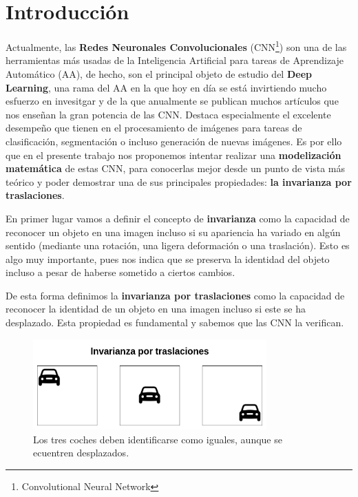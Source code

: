 

\chapter{Introducción}

\noindent Actualmente, las \textbf{Redes Neuronales Convolucionales} (CNN\footnote{Convolutional Neural Network}) son una de las herramientas más usadas de la Inteligencia Artificial para tareas de Aprendizaje Automático (AA), de hecho, son el principal objeto de estudio del \textbf{Deep Learning}, una rama del AA en la que hoy en día se está invirtiendo mucho esfuerzo en invesitgar y de la que anualmente se publican muchos artículos que nos enseñan la gran potencia de las CNN. Destaca especialmente el excelente desempeño que tienen en el procesamiento de imágenes para tareas de clasificación, segmentación o incluso generación de nuevas imágenes. Es por ello que en el presente trabajo nos proponemos intentar realizar una \textbf{modelización matemática} de estas CNN, para conocerlas mejor desde un punto de vista más teórico y poder demostrar una de sus principales propiedades: \textbf{la invarianza por traslaciones}.

\medskip

\noindent En primer lugar vamos a definir el concepto de \textbf{invarianza} como la capacidad de reconocer un objeto en una imagen incluso si su apariencia ha variado en algún sentido (mediante una rotación, una  ligera deformación o una traslación). Esto es algo muy importante, pues nos indica que se preserva la identidad del objeto incluso a pesar de haberse sometido a ciertos cambios.

\medskip

\noindent De esta forma definimos la \textbf{invarianza por traslaciones} como la capacidad de reconocer la identidad de un objeto en una imagen incluso si este se ha desplazado. Esta propiedad es fundamental y sabemos que las CNN la verifican.

\begin{figure} [!h]
    \centering
    \includegraphics[width=0.8\textwidth]{img/translation_invariance.png}
    \caption{Los tres coches deben identificarse como iguales, aunque se ecuentren desplazados.}
    \label{fig:invarianza_traslaciones}
\end{figure}

